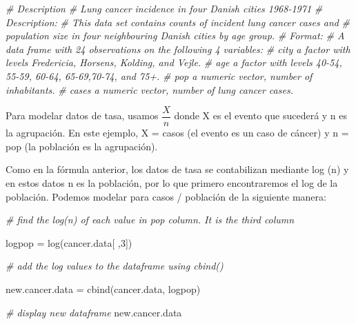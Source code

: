 \documentclass[
]{book}
\newenvironment{Shaded}{\begin{snugshade}}{\end{snugshade}}
\newcommand{\CommentTok}[1]{\textcolor[rgb]{0.56,0.35,0.01}{\textit{#1}}}
\newcommand{\DecValTok}[1]{\textcolor[rgb]{0.00,0.00,0.81}{#1}}
\newcommand{\FunctionTok}[1]{\textcolor[rgb]{0.00,0.00,0.00}{#1}}
\newcommand{\NormalTok}[1]{#1}
\newcommand{\OtherTok}[1]{\textcolor[rgb]{0.56,0.35,0.01}{#1}}
\begin{document}
\begin{Shaded}
\begin{Highlighting}[]
\CommentTok{\# Description}
\CommentTok{\# Lung cancer incidence in four Danish cities 1968{-}1971}
\CommentTok{\# Description:}
\CommentTok{\# This data set contains counts of incident lung cancer cases and}
\CommentTok{\# population size in four neighbouring Danish cities by age group.}
\CommentTok{\# Format:}
\CommentTok{\# A data frame with 24 observations on the following 4 variables:}
\CommentTok{\# city a factor with levels Fredericia, Horsens, Kolding, and Vejle.}
\CommentTok{\# age a factor with levels 40{-}54, 55{-}59, 60{-}64, 65{-}69,70{-}74, and 75+.}
\CommentTok{\# pop a numeric vector, number of inhabitants.}
\CommentTok{\# cases a numeric vector, number of lung cancer cases.}
\end{Highlighting}
\end{Shaded}

Para modelar datos de tasa, usamos \(\dfrac{X}{n}\) donde X es el evento que sucederá y n es la agrupación. En este ejemplo, X = casos (el evento es un caso de cáncer) y n = pop (la población es la agrupación).

Como en la fórmula anterior, los datos de tasa se contabilizan mediante log (n) y en estos datos n es la población, por lo que primero encontraremos el log de la población. Podemos modelar para casos / población de la siguiente manera:

\begin{Shaded}
\begin{Highlighting}[]
\CommentTok{\# find the log(n) of each value in \textquotesingle{}pop\textquotesingle{} column. It is the third column}

\NormalTok{logpop }\OtherTok{=} \FunctionTok{log}\NormalTok{(cancer.data[ ,}\DecValTok{3}\NormalTok{])}

\CommentTok{\# add the log values to the dataframe using \textquotesingle{}cbind()\textquotesingle{}}

\NormalTok{new.cancer.data }\OtherTok{=} \FunctionTok{cbind}\NormalTok{(cancer.data, logpop)}

\CommentTok{\# display new dataframe}
\NormalTok{new.cancer.data}
\end{Highlighting}
\end{Shaded}
\end{document}
